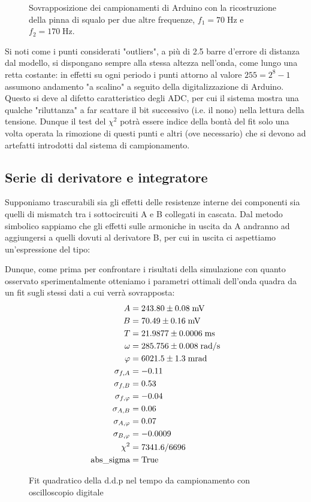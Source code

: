 \documentclass{article}[a4paper, oneside ,11pt]
\begin{document}
\begin{figure}[!htb]
	\scalebox{0.55}{}\hfill \scalebox{0.55}{}
 	\caption{Sovrapposizione dei campionamenti di Arduino con la ricostruzione della pinna di squalo per due altre frequenze, $f_1 = 70 \; \si{\hertz}$ e $f_2 = 170 \; \si{\hertz}$. \label{plt:fins}}
\end{figure}
Si noti come i punti considerati "outliers", a più di 2.5 barre d'errore di distanza dal modello, si dispongano sempre alla stessa altezza nell'onda, come lungo una retta costante: in effetti su ogni periodo i punti attorno al valore $255 = 2^8 -1$ assumono andamento "a scalino" a seguito della digitalizzazione di Arduino. Questo si deve al difetto caratteristico degli ADC, per cui il sistema mostra una qualche "riluttanza" a far scattare il bit successivo (i.e. il nono) nella lettura della tensione. Dunque il test del $\chi^2$ potrà essere indice della bontà del fit solo una volta operata la rimozione di questi punti e altri (ove necessario) che si devono ad artefatti introdotti dal sistema di campionamento.
\subsection{Serie di derivatore e integratore}
Supponiamo trascurabili sia gli effetti delle resistenze interne dei componenti sia quelli di mismatch tra i sottocircuiti A e B collegati in cascata. Dal metodo simbolico sappiamo che gli effetti sulle armoniche in uscita da A andranno ad aggiungersi a quelli dovuti al derivatore B, per cui in uscita ci aspettiamo un'espressione del tipo:

Dunque, come prima per confrontare i risultati della simulazione con quanto osservato sperimentalmente otteniamo i parametri ottimali dell'onda quadra da un fit sugli stessi dati a cui verrà sovrapposta:\\
\begin{align*}
A &= 243.80 \pm 0.08 \; \rm mV \\
B &= 70.49 \pm 0.16 \; \rm mV \\
T &= 21.9877 \pm 0.0006 \; \rm ms \\
\omega &= 285.756 \pm 0.008 \; \rm rad/s \\  
\phi &= 6021.5 \pm 1.3 \; \rm m rad \\
\sigma_{f, A} &= -0.11 \\   
\sigma_{f, B} &= 0.53 \\
\sigma_{f, \phi} &= -0.04 \\ 
\sigma_{A, B} &= 0.06 \\
\sigma_{A, \phi} &= 0.07 \\  
\sigma_{B, \phi} &= -0.0009 \\
\chi^2 &= 7341.6/6696 \\
\text{abs\_sigma} &= \rm True
\end{align*}
\begin{figure}[!htb]
	\centering 
 	\caption{Fit quadratico della d.d.p nel tempo da campionamento con oscilloscopio digitale \label{plt:DSOpar}}
\end{figure}
\end{document}
